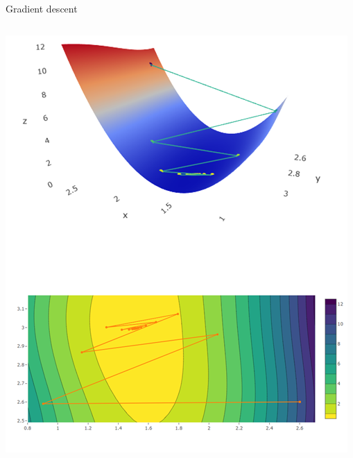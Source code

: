 \documentclass[aspectratio=169]{../latex_main/tntbeamer}  %
\begin{document}
\begin{frame}{Gradient descent}
\begin{columns}
	            
	            \begin{column}{.4\textwidth}
	                      \begin{center}
	                          \includegraphics[scale=.38]{Bild11}
	                      \end{center} 
	            \end{column}
	       \end{columns}
	\end{frame}
	
	
	
\end{document}
